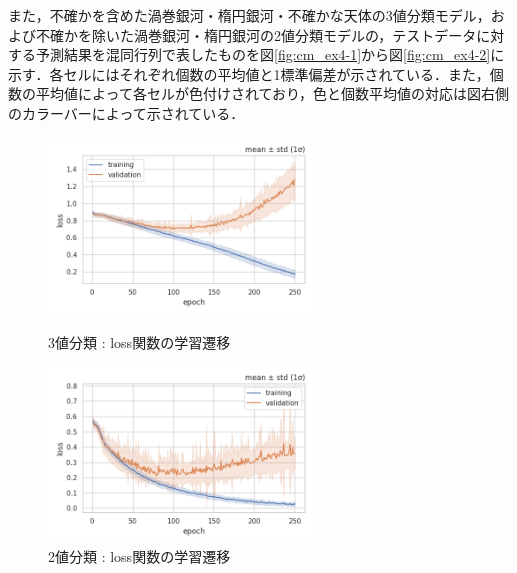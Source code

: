 \documentclass[a4j, 11pt]{jreport}
\begin{document}
また，不確かを含めた渦巻銀河・楕円銀河・不確かな天体の3値分類モデル，および不確かを除いた渦巻銀河・楕円銀河の2値分類モデルの，テストデータに対する予測結果を混同行列で表したものを図\ref{fig:cm_ex4-1}から図\ref{fig:cm_ex4-2}に示す．各セルにはそれぞれ個数の平均値と1標準偏差が示されている．また，個数の平均値によって各セルが色付けされており，色と個数平均値の対応は図右側のカラーバーによって示されている．


\begin{figure}[htbp]
  \begin{minipage}[b]{0.45\hsize}
    \centering
    \includegraphics[keepaspectratio, width=7cm]{images/losses_ex4-1.png}
    \caption{3値分類 : loss関数の学習遷移}
		\label{fig:losses_ex4-1}
  \end{minipage}
  \begin{minipage}[b]{0.45\hsize}
    \centering
    \includegraphics[keepaspectratio, width=7cm]{images/losses_ex4-2.png}
    \caption{2値分類 : loss関数の学習遷移}
		\label{fig:losses_ex4-2}
  \end{minipage}
\end{figure}
\end{document}
